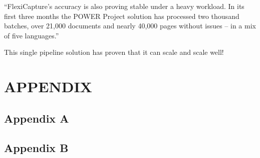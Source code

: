 \documentclass[conference]{IEEEtran}
\begin{document}
``FlexiCapture's accuracy is also proving stable under a heavy workload. In its first three months the POWER Project solution has processed two thousand batches, over 21,000 documents and nearly 40,000 pages without issues – in a mix of five languages.'' \cite{pepsico}

This single pipeline solution has proven that it can scale and scale well!

\section{APPENDIX}
\subsection{Appendix A}

\subsection{Appendix B}



\end{document}
